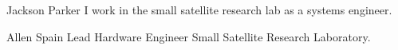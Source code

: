 \documentclass[conference]{IEEEtran}
\begin{document}


\ifCLASSOPTIONcaptionsoff
  \newpage
\fi




% 



\begin{IEEEbiography}{Jackson Parker}
I work in the small satellite research lab as a systems engineer.
\end{IEEEbiography}


\begin{IEEEbiography}{Allen Spain}
Lead Hardware Engineer Small Satellite Research Laboratory.
\end{IEEEbiography}
\end{document}
